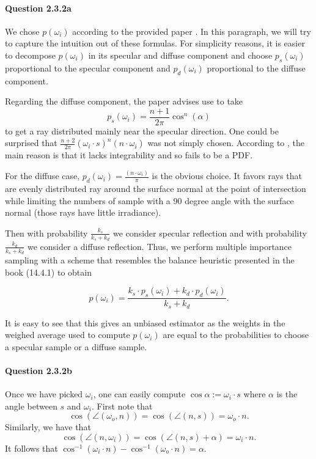 \documentclass{article}
\begin{document}
\paragraph{Question 2.3.2a}
We chose $p(\omega_i)$ according to the provided paper \cite{lawrence}. In this paragraph, we will try to capture the intuition out of these formulas. For simplicity reasons, it is easier to decompose $p(\omega_i)$ in its specular and diffuse component and choose $p_s(\omega_i)$ proportional to the specular component and $p_d(\omega_i)$ proportional to the diffuse component.

Regarding the diffuse component, the paper advises use to take $$p_s(\omega_i) = \frac{n+1}{2\pi}\cos^n(\alpha)$$ to get a ray distributed mainly near the specular direction.
One could be surprised that $\frac{n+2}{2\pi}(\omega_i \cdot s)^n(n \cdot \omega_i)$ was not simply chosen.
According to \cite{lafortune}, the main reason is that it lacks integrability and so fails to be a PDF.

For the diffuse case, $p_d(\omega_i) = \frac{(n \cdot \omega_i)}{\pi}$ is the obvious choice. It favors rays that are evenly distributed ray around the surface normal at the point of intersection while limiting the numbers of sample with a 90 degree angle with the surface normal (those rays have little irradiance). 

Then with probability $\frac{k_s}{k_s + k_d}$ we consider specular reflection and with probability $\frac{k_d}{k_s + k_d}$ we consider a diffuse reflection. Thus, we perform multiple importance sampling with a scheme that resembles the balance heuristic presented in the book (14.4.1) to obtain

$$p(\omega_i) = \frac{k_s \cdot p_s(\omega_i) + k_d \cdot p_d(\omega_i)}{k_s + k_d}.$$

It is easy to see that this gives an unbiased estimator as the weights in the weighed average used to compute $p(\omega_i)$ are equal to the probabilities to choose a specular sample or a diffuse sample.

\paragraph{Question 2.3.2b}Once we have picked $\omega_i$, one can easily compute\linebreak 
$\cos\alpha := \omega_i \cdot s$ where $\alpha$ is the angle between $s$ and $\omega_i$. First note that $$\cos \left (\angle(\omega_o, n)\right ) = \cos \left ( \angle(n,s) \right ) = \omega_o\cdot n.$$ Similarly, we have that
$$\cos\left(\angle (n, \omega_i)\right) = \cos\left(\angle(n,s) + \alpha\right) = \omega_i \cdot n.$$
It follows that $\cos^{-1}{\left(\omega_i \cdot n\right)} - \cos^{-1}{\left(\omega_o\cdot n\right)} = \alpha.$
\end{document}
